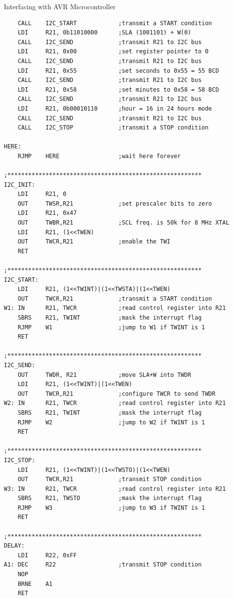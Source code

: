 \documentclass[11pt]{beamer}
\begin{document}
\begin{frame}{Interfacing with AVR Microcontroller}
\begin{verbatim}
    CALL    I2C_START            ;transmit a START condition
    LDI     R21, 0b11010000      ;SLA (1001101) + W(0)
    CALL    I2C_SEND             ;transmit R21 to I2C bus
    LDI     R21, 0x00            ;set register pointer to 0
    CALL    I2C_SEND             ;transmit R21 to I2C bus
    LDI     R21, 0x55            ;set seconds to 0x55 = 55 BCD
    CALL    I2C_SEND             ;transmit R21 to I2C bus
    LDI     R21, 0x58            ;set minutes to 0x58 = 58 BCD
    CALL    I2C_SEND             ;transmit R21 to I2C bus
    LDI     R21, 0b00010110      ;hour = 16 in 24 hours mode
    CALL    I2C_SEND             ;transmit R21 to I2C bus
    CALL    I2C_STOP             ;transmit a STOP condition

HERE:
    RJMP    HERE                 ;wait here forever

;********************************************************
I2C_INIT:
    LDI     R21, 0
    OUT     TWSR,R21             ;set prescaler bits to zero
    LDI     R21, 0x47
    OUT     TWBR,R21             ;SCL freq. is 50k for 8 MHz XTAL
    LDI     R21, (1<<TWEN)
    OUT     TWCR,R21             ;enable the TWI
    RET

;********************************************************
I2C_START:
    LDI     R21, (1<<TWINT)|(1<<TWSTA)|(1<<TWEN)
    OUT     TWCR,R21             ;transmit a START condition
W1: IN      R21, TWCR            ;read control register into R21
    SBRS    R21, TWINT           ;mask the interrupt flag
    RJMP    W1                   ;jump to W1 if TWINT is 1
    RET

;********************************************************
I2C_SEND:
    OUT     TWDR, R21            ;move SLA+W into TWDR
    LDI     R21, (1<<TWINT)|(1<<TWEN)
    OUT     TWCR,R21             ;configure TWCR to send TWDR
W2: IN      R21, TWCR            ;read control register into R21
    SBRS    R21, TWINT           ;mask the interrupt flag
    RJMP    W2                   ;jump to W2 if TWINT is 1
    RET

;********************************************************
I2C_STOP:
    LDI     R21, (1<<TWINT)|(1<<TWSTO)|(1<<TWEN)
    OUT     TWCR,R21             ;transmit STOP condition
W3: IN      R21, TWCR            ;read control register into R21
    SBRS    R21, TWSTO           ;mask the interrupt flag
    RJMP    W3                   ;jump to W3 if TWINT is 1
    RET

;********************************************************
DELAY:
    LDI     R22, 0xFF
A1: DEC     R22                  ;transmit STOP condition
    NOP
    BRNE    A1
    RET
        \end{verbatim}


\end{frame}
\end{document}
